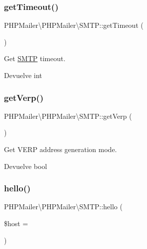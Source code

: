 \subsubsection{\texorpdfstring{get\+Timeout()}{getTimeout()}}
{\footnotesize\ttfamily P\+H\+P\+Mailer\textbackslash{}\+P\+H\+P\+Mailer\textbackslash{}\+S\+M\+T\+P\+::get\+Timeout (\begin{DoxyParamCaption}{ }\end{DoxyParamCaption})}

Get \hyperlink{classPHPMailer_1_1PHPMailer_1_1SMTP}{S\+M\+TP} timeout.

\begin{DoxyReturn}{Devuelve}
int 
\end{DoxyReturn}
\mbox{\label{classPHPMailer_1_1PHPMailer_1_1SMTP_a21e09a3670b678e6dd9061b5fe6152df}} 
\subsubsection{\texorpdfstring{get\+Verp()}{getVerp()}}
{\footnotesize\ttfamily P\+H\+P\+Mailer\textbackslash{}\+P\+H\+P\+Mailer\textbackslash{}\+S\+M\+T\+P\+::get\+Verp (\begin{DoxyParamCaption}{ }\end{DoxyParamCaption})}

Get V\+E\+RP address generation mode.

\begin{DoxyReturn}{Devuelve}
bool 
\end{DoxyReturn}
\mbox{\label{classPHPMailer_1_1PHPMailer_1_1SMTP_a7c2586a9df8e7f638c29ba6c52a39008}} 
\subsubsection{\texorpdfstring{hello()}{hello()}}
{\footnotesize\ttfamily P\+H\+P\+Mailer\textbackslash{}\+P\+H\+P\+Mailer\textbackslash{}\+S\+M\+T\+P\+::hello (\begin{DoxyParamCaption}\item[{}]{\$host = {\ttfamily \textquotesingle{}\textquotesingle{}} }\end{DoxyParamCaption})}

